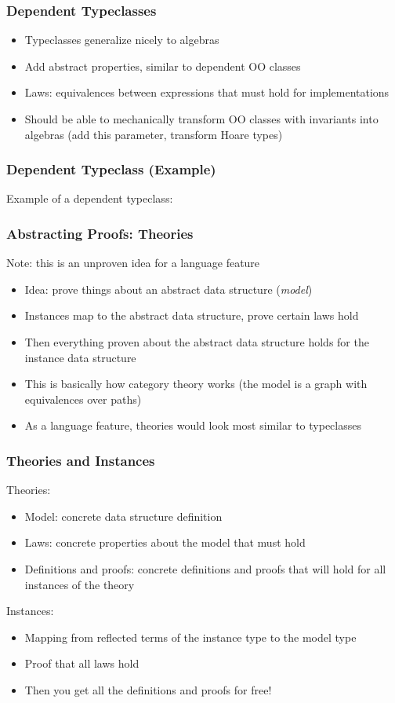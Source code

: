 \documentclass{beamer}
\begin{document}
\begin{frame}
  \frametitle{Dependent Typeclasses}
  \begin{itemize}
    \item Typeclasses generalize nicely to algebras
    \item Add abstract properties, similar to dependent OO classes
    \item Laws: equivalences between expressions that must hold for
      implementations
    \item Should be able to mechanically transform OO classes with
      invariants into algebras (add this parameter, transform Hoare
      types)
  \end{itemize}
\end{frame}

\begin{frame}
  \frametitle{Dependent Typeclass (Example)}
  Example of a dependent typeclass:
  \lstset{language=haskell, basicstyle=\ttfamily\scriptsize}
  
\end{frame}

\begin{frame}
  \frametitle{Abstracting Proofs: Theories}

  Note: this is an unproven idea for a language feature
  \begin{itemize}
    \item Idea: prove things about an abstract data structure
      (\emph{model})
    \item Instances map to the abstract data structure, prove certain laws hold
    \item Then everything proven about the abstract data structure
      holds for the instance data structure
    \item This is basically how category theory works (the model is a
      graph with equivalences over paths)
    \item As a language feature, theories would look most similar to
      typeclasses
  \end{itemize}
\end{frame}

\begin{frame}
  \frametitle{Theories and Instances}
  Theories:
  \begin{itemize}
    \item Model: concrete data structure definition
    \item Laws: concrete properties about the model that must hold
    \item Definitions and proofs: concrete definitions and proofs that
      will hold for all instances of the theory
  \end{itemize}
  Instances:
  \begin{itemize}
    \item Mapping from reflected terms of the instance type to the
      model type
    \item Proof that all laws hold
    \item Then you get all the definitions and proofs for free!
  \end{itemize}
\end{frame}
\end{document}
